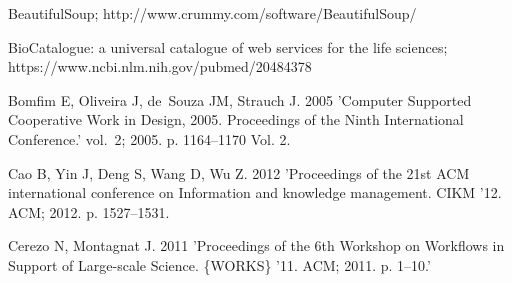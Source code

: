 \documentclass{doublecol-new}
\def\newblock{\hskip .11em plus .33em minus .07em}
\theoremstyle{TH}{
\newtheorem{lemma}{Lemma}
\newtheorem{theorem}[lemma]{Theorem}
\newtheorem{corrolary}[lemma]{Corrolary}
\newtheorem{conjecture}[lemma]{Conjecture}
\newtheorem{proposition}[lemma]{Proposition}
\newtheorem{claim}[lemma]{Claim}
\newtheorem{stheorem}[lemma]{Wrong Theorem}
\newtheorem{algorithm}{Algorithm}
}
\theoremstyle{THrm}{
\newtheorem{definition}{Definition}[section]
\newtheorem{question}{Question}[section]
\newtheorem{remark}{Remark}
\newtheorem{scheme}{Scheme}
}
\theoremstyle{THhit}{
\newtheorem{case}{Case}[section]
}
\begin{document}
\begin{thebibliography}{10}

BeautifulSoup; http://www.crummy.com/software/BeautifulSoup/

BioCatalogue: a universal catalogue of web services for the life sciences; https://www.ncbi.nlm.nih.gov/pubmed/20484378


Bomfim E, Oliveira J, de~Souza JM, Strauch J. {2005} 'Computer Supported Cooperative Work in Design, 2005. Proceedings
of the Ninth International Conference.' vol.~2; 2005. p. 1164--1170 Vol. 2.


Cao B, Yin J, Deng S, Wang D, Wu Z. {2012} 'Proceedings of the 21st ACM international conference on
Information and knowledge management. CIKM '12. ACM; 2012. p. 1527--1531.


Cerezo N, Montagnat J. {2011} 'Proceedings of the 6th Workshop on Workflows in Support of
Large-scale Science. \{WORKS\} '11. ACM; 2011. p. 1--10.'



\end{thebibliography}
\end{document}
